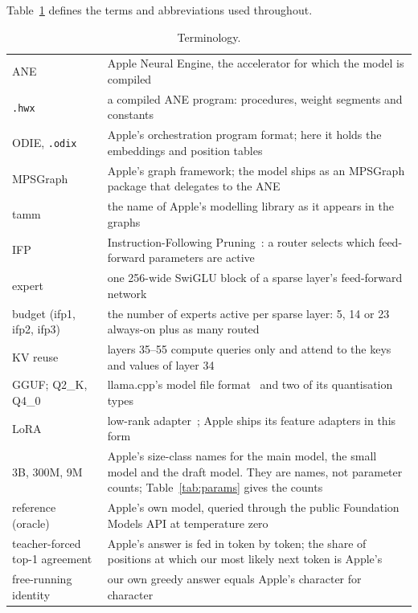 \documentclass[11pt,reqno]{amsart}
\makeatletter
\newcommand{\code}[1]{\texttt{#1}}
\renewcommand\paragraph{\@startsection{paragraph}{4}\z@{.6\linespacing\@plus.2\linespacing}{-\fontdimen2\font}{\normalfont\bfseries}}
\theoremstyle{definition}
\makeatother
\begin{document}
\paragraph{Terminology.} Table~\ref{tab:terms} defines the terms and abbreviations used throughout.

\begin{table}[!htbp]
\centering\footnotesize
\begin{tabular}{@{}p{38mm}p{120mm}@{}}
\toprule
ANE & Apple Neural Engine, the accelerator for which the model is compiled \\
\code{.hwx} & a compiled ANE program: procedures, weight segments and constants \\
ODIE, \code{.odix} & Apple's orchestration program format; here it holds the embeddings and position tables \\
MPSGraph & Apple's graph framework; the model ships as an MPSGraph package that delegates to the ANE \\
tamm & the name of Apple's modelling library as it appears in the graphs \\
IFP & Instruction-Following Pruning~\cite{hou2025ifp}: a router selects which feed-forward parameters are active \\
expert & one 256-wide SwiGLU block of a sparse layer's feed-forward network \\
budget (ifp1, ifp2, ifp3) & the number of experts active per sparse layer: 5, 14 or 23 always-on plus as many routed \\
KV reuse & layers 35--55 compute queries only and attend to the keys and values of layer 34 \\
GGUF; Q2\_K, Q4\_0 & llama.cpp's model file format~\cite{gguf} and two of its quantisation types \\
LoRA & low-rank adapter~\cite{hu2021lora}; Apple ships its feature adapters in this form \\
3B, 300M, 9M & Apple's size-class names for the main model, the small model and the draft model. They are names, not parameter counts; Table~\ref{tab:params} gives the counts \\
reference (oracle) & Apple's own model, queried through the public Foundation Models API at temperature zero \\
teacher-forced top-1 agreement & Apple's answer is fed in token by token; the share of positions at which our most likely next token is Apple's \\
free-running identity & our own greedy answer equals Apple's character for character \\
\bottomrule
\end{tabular}
\caption{Terminology.}\label{tab:terms}
\end{table}
\end{document}
